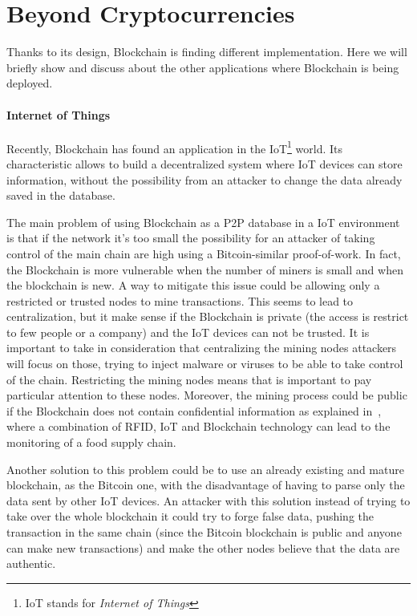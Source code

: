 \section{Beyond Cryptocurrencies}
\label{sec:beyond_crypto}

Thanks to its design, Blockchain is finding different implementation. Here
we will briefly show and discuss about the other applications where Blockchain
is being deployed.

\paragraph*{Internet of Things}

Recently, Blockchain has found an application in the IoT\footnote{IoT stands
for \textit{Internet of Things}} world\cite{politecnico16}. Its characteristic
allows to build a decentralized system where IoT devices can store information,
without the possibility from an attacker to change the data already saved in
the database\cite{politecnico16}.

The main problem of using Blockchain as a P2P database in a IoT environment is
that if the network it's too small the possibility for an attacker of taking
control of the main chain are high using a Bitcoin-similar proof-of-work. In
fact, the Blockchain is more vulnerable when the number of miners is small and
when the blockchain is new. A way to mitigate this issue could be allowing only
a restricted or trusted nodes to mine transactions. This seems to lead to
centralization, but it make sense if the Blockchain is private (the access is
restrict to few people or a company) and the IoT devices can not be trusted.
It is important to take in consideration that centralizing the mining nodes
attackers will focus on those, trying to inject malware or viruses to be able to
take control of the chain. Restricting the mining nodes means that is important
to pay particular attention to these nodes.
Moreover, the mining process could be public if the Blockchain does not contain
confidential information as explained in~\cite{tian17}, where a combination of
RFID, IoT and Blockchain technology can lead to the monitoring of a food supply
chain.

Another solution to this problem could be to use an already existing and mature
blockchain, as the Bitcoin one, with the disadvantage of having to parse only
the data sent by other IoT devices. An attacker with this solution instead of
trying to take over the whole blockchain it could try to forge false data,
pushing the transaction in the same chain (since the Bitcoin blockchain is
public and anyone can make new transactions) and make the other nodes believe
that the data are authentic.

